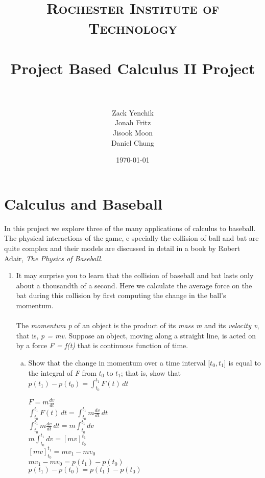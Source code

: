\documentclass[paper=a4, fontsize=11pt]{scrartcl}
\title{	
\normalfont \normalsize 
\textsc{Rochester Institute of Technology} \\ [25pt] 
\horrule{0.5pt} \\[0.4cm]
\huge Project Based Calculus II Project \\ 
\horrule{2pt} \\[0.5cm] 
}
\author{Zack Yenchik\\Jonah Fritz\\ Jisook Moon \\ Daniel Chung}
\date{\normalsize\today}
\numberwithin{equation}{section}
\numberwithin{figure}{section}
\numberwithin{table}{section}
\begin{document}
\maketitle 

\section{Calculus and Baseball}

\hspace{10mm}In this project we explore three of the many applications of calculus to baseball. The physical interactions of the game, e
specially the collision of ball and bat are quite complex and their models are discussed in detail in a book by Robert Adair, \textit{The Physics of Baseball}. 

\begin{enumerate}[1.]
	\item It may surprise you to learn that the collision of baseball and bat lasts only about a thousandth of a second. Here we calculate the average force on the bat during this collision by first computing the change in the 	ball's momentum.\\\\ The \textit{momentum p} of an object is the product of its \textit{mass m} and its \textit{velocity v}, that is, \textit{p = mv}. Suppose an object, moving along a straight line, is acted on by a force \textit{F 	= f(t)} that is continuous function of time.
		\begin{enumerate}[(a)] 
			\item Show that the change in momentum over a time interval [$t_{0}, t_{1}$] is equal to the integral of \textit{F} from $t_{0}$ to $t_{1}$; that is, show that\\ 
			\center $p(t_{1}) - p(t_{0}) =  \int _{t_{0}}^{t_{1}} F(t) \,dt$ \\ 
			\raggedright $F = m \frac{dv}{dt}$ \\
			$\int _{t_{0}}^{t_{1}} F(t) \,dt = \int _{t_{0}}^{t_{1}} m \frac{dv}{dt} \,dt$\\
			$\int _{t_{0}}^{t_{1}} m \frac{dv}{dt} \,dt = m \int_{t_{0}}^{t_{1}} dv$\\
			$m \int_{t_{0}}^{t_{1}} dv = [mv]_{t_{0}}^{t_{1}}$\\
			$[mv]_{t_{0}}^{t_{1}} = mv_{1} - mv_{0}$\\
			$mv_{1} - mv_{0} = p(t_{1}) - p(t_{0})$\\
			$p(t_{1}) - p(t_{0}) = p(t_{1}) - p(t_{0})$
		\end{enumerate}

\end{enumerate}
\end{document}
